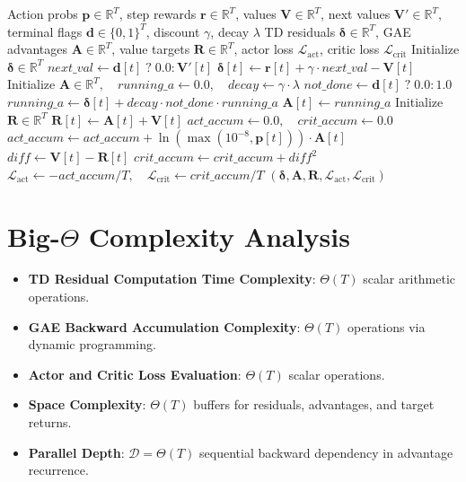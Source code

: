 \documentclass[11pt,a4paper]{article}
\theoremstyle{definition}
\begin{document}
\begin{algorithm}[H]
\caption{Actor-Critic 1-Step TD Residual, GAE Advantage, and Loss Evaluation}
\begin{algorithmic}[1]
\Require Action probs $\mathbf{p} \in \mathbb{R}^T$, step rewards $\mathbf{r} \in \mathbb{R}^T$, values $\mathbf{V} \in \mathbb{R}^T$, next values $\mathbf{V}' \in \mathbb{R}^T$, terminal flags $\mathbf{d} \in \{0, 1\}^T$, discount $\gamma$, decay $\lambda$
\Ensure TD residuals $\boldsymbol{\delta} \in \mathbb{R}^T$, GAE advantages $\mathbf{A} \in \mathbb{R}^T$, value targets $\mathbf{R} \in \mathbb{R}^T$, actor loss $\mathcal{L}_{\text{act}}$, critic loss $\mathcal{L}_{\text{crit}}$
\State Initialize $\boldsymbol{\delta} \in \mathbb{R}^T$
 
    \State $next\_val \gets \mathbf{d}[t] \;?\; 0.0 : \mathbf{V}'[t]$
    \State $\boldsymbol{\delta}[t] \gets \mathbf{r}[t] + \gamma \cdot next\_val - \mathbf{V}[t]$
\EndFor
\State Initialize $\mathbf{A} \in \mathbb{R}^T, \quad running\_a \gets 0.0, \quad decay \gets \gamma \cdot \lambda$
 
    \State $not\_done \gets \mathbf{d}[t] \;?\; 0.0 : 1.0$
    \State $running\_a \gets \boldsymbol{\delta}[t] + decay \cdot not\_done \cdot running\_a$
    \State $\mathbf{A}[t] \gets running\_a$
\EndFor
\State Initialize $\mathbf{R} \in \mathbb{R}^T$
 
    \State $\mathbf{R}[t] \gets \mathbf{A}[t] + \mathbf{V}[t]$
\EndFor
\State $act\_accum \gets 0.0, \quad crit\_accum \gets 0.0$
 
    \State $act\_accum \gets act\_accum + \ln(\max(10^{-8}, \mathbf{p}[t])) \cdot \mathbf{A}[t]$
    \State $diff \gets \mathbf{V}[t] - \mathbf{R}[t]$
    \State $crit\_accum \gets crit\_accum + diff^2$
\EndFor
\State $\mathcal{L}_{\text{act}} \gets - act\_accum / T, \quad \mathcal{L}_{\text{crit}} \gets crit\_accum / T$
\State \Return $(\boldsymbol{\delta}, \mathbf{A}, \mathbf{R}, \mathcal{L}_{\text{act}}, \mathcal{L}_{\text{crit}})$
\end{algorithmic}
\end{algorithm}

\section{Big-$\Theta$ Complexity Analysis}

\begin{itemize}
    \item \textbf{TD Residual Computation Time Complexity}: $\Theta(T)$ scalar arithmetic operations.
    \item \textbf{GAE Backward Accumulation Complexity}: $\Theta(T)$ operations via dynamic programming.
    \item \textbf{Actor and Critic Loss Evaluation}: $\Theta(T)$ scalar operations.
    \item \textbf{Space Complexity}: $\Theta(T)$ buffers for residuals, advantages, and target returns.
    \item \textbf{Parallel Depth}: $\mathcal{D} = \Theta(T)$ sequential backward dependency in advantage recurrence.
\end{itemize}
\end{document}
